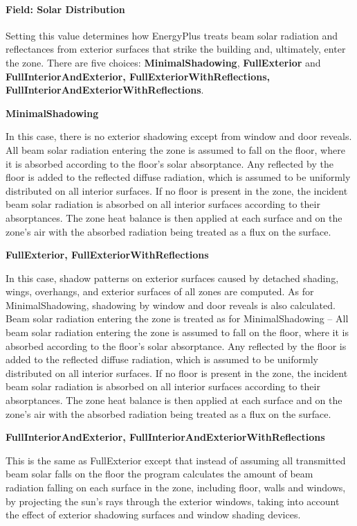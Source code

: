 \paragraph{Field: Solar Distribution}\label{field-solar-distribution}

Setting this value determines how EnergyPlus treats beam solar radiation and reflectances from exterior surfaces that strike the building and, ultimately, enter the zone. There are five choices: \textbf{MinimalShadowing}, \textbf{FullExterior} and \textbf{FullInteriorAndExterior, FullExteriorWithReflections, FullInteriorAndExteriorWithReflections}.

\textbf{MinimalShadowing}

In this case, there is no exterior shadowing except from window and door reveals. All beam solar radiation entering the zone is assumed to fall on the floor, where it is absorbed according to the floor's solar absorptance. Any reflected by the floor is added to the reflected diffuse radiation, which is assumed to be uniformly distributed on all interior surfaces. If no floor is present in the zone, the incident beam solar radiation is absorbed on all interior surfaces according to their absorptances. The zone heat balance is then applied at each surface and on the zone's air with the absorbed radiation being treated as a flux on the surface.

\textbf{FullExterior, FullExteriorWithReflections}

In this case, shadow patterns on exterior surfaces caused by detached shading, wings, overhangs, and exterior surfaces of all zones are computed. As for MinimalShadowing, shadowing by window and door reveals is also calculated. Beam solar radiation entering the zone is treated as for MinimalShadowing -- All beam solar radiation entering the zone is assumed to fall on the floor, where it is absorbed according to the floor's solar absorptance. Any reflected by the floor is added to the reflected diffuse radiation, which is assumed to be uniformly distributed on all interior surfaces. If no floor is present in the zone, the incident beam solar radiation is absorbed on all interior surfaces according to their absorptances. The zone heat balance is then applied at each surface and on the zone's air with the absorbed radiation being treated as a flux on the surface.

\textbf{FullInteriorAndExterior, FullInteriorAndExteriorWithReflections}

This is the same as FullExterior except that instead of assuming all transmitted beam solar falls on the floor the program calculates the amount of beam radiation falling on each surface in the zone, including floor, walls and windows, by projecting the sun's rays through the exterior windows, taking into account the effect of exterior shadowing surfaces and window shading devices.


